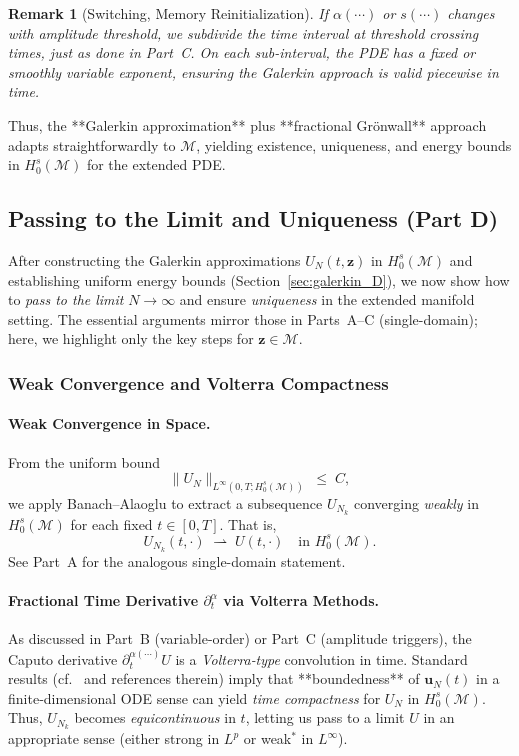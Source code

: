 \documentclass[12pt]{article}
\newtheorem{remark}[theorem]{Remark}
\begin{document}
\begin{remark}[Switching, Memory Reinitialization]
If $\alpha(\cdots)$ or $s(\cdots)$ changes with amplitude threshold, we subdivide the 
time interval at threshold crossing times, just as done in Part~C. On each sub-interval, 
the PDE has a fixed or smoothly variable exponent, ensuring the Galerkin approach is 
valid piecewise in time. 
\end{remark}

Thus, the **Galerkin approximation** plus **fractional Grönwall** approach adapts 
straightforwardly to \(\mathcal{M}\), yielding existence, uniqueness, and energy bounds 
in $H_0^s(\mathcal{M})$ for the extended PDE. 
\subsection{Passing to the Limit and Uniqueness (Part D)}
\label{sec:limit_D}

After constructing the Galerkin approximations $U_N(t,\mathbf{z})$ in $H_0^s(\mathcal{M})$ 
and establishing uniform energy bounds (Section~\ref{sec:galerkin_D}), we now show how to 
\emph{pass to the limit} $N\to\infty$ and ensure \emph{uniqueness} in the extended manifold 
setting. The essential arguments mirror those in Parts~A--C (single-domain); here, we 
highlight only the key steps for $\mathbf{z}\in \mathcal{M}$.

\subsubsection{Weak Convergence and Volterra Compactness}

\paragraph{Weak Convergence in Space.}
From the uniform bound 
\[
\|U_N\|_{L^\infty(0,T;H_0^s(\mathcal{M}))} \;\le\; C,
\]
we apply Banach–Alaoglu to extract a subsequence $U_{N_k}$ converging \emph{weakly} 
in $H_0^s(\mathcal{M})$ for each fixed $t\in[0,T]$. That is,
\[
U_{N_k}(t,\cdot) \;\rightharpoonup\; U(t,\cdot)
\quad
\text{in }H_0^s(\mathcal{M}).
\]
See Part~A for the analogous single-domain statement.

\paragraph{Fractional Time Derivative \texorpdfstring{\(\partial_t^\alpha\)}{} via Volterra Methods.}
As discussed in Part~B (variable-order) or Part~C (amplitude triggers), the Caputo 
derivative $\partial_t^{\alpha(\cdots)} U$ is a \emph{Volterra‐type} convolution in time. 
Standard results (cf.\ \cite[Chs.~3--4]{Diethelm2010} and references therein) imply that 
**boundedness** of $\mathbf{u}_N(t)$ in a finite‐dimensional ODE sense can yield 
\emph{time compactness} for $U_N$ in $H_0^s(\mathcal{M})$. Thus, $U_{N_k}$ becomes 
\emph{equicontinuous} in $t$, letting us pass to a limit $U$ in an appropriate sense 
(either strong in $L^p$ or weak$^*$ in $L^\infty$).
\end{document}
